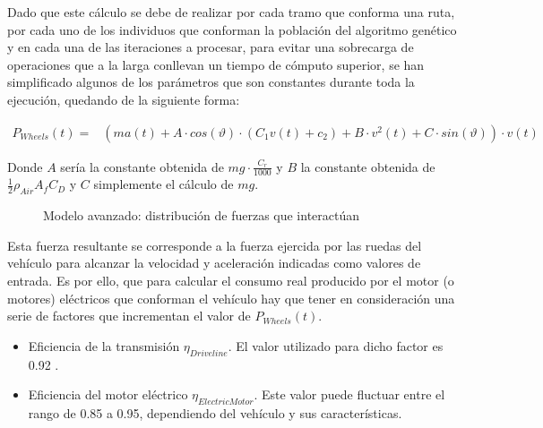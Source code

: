 \documentclass[11pt,spanish,listoffigures,listoftables]{tfgetsinf}
\begin{document}
\begin{itemize}
    Dado que este cálculo se debe de realizar por cada tramo que conforma una ruta, por cada uno de los individuos que conforman la población del algoritmo genético y en cada una de las iteraciones a procesar, para evitar una sobrecarga de operaciones que a la larga conllevan un tiempo de cómputo superior, se han simplificado algunos de los parámetros que son constantes durante toda la ejecución, quedando de la siguiente forma:
    
    \begin{align*}
        P_{Wheels}(t) = & \left(ma(t) + A \cdot cos(\vartheta) \cdot (C_{1}v(t) + c_{2}) + B \cdot v^{2}(t) + C \cdot sin(\vartheta) \right) \cdot v(t)
    \end{align*}
    
    Donde $A$ sería la constante obtenida de $mg \cdot \frac{C_{r}}{1000}$ y $B$ la constante obtenida de $\frac{1}{2}\rho_{Air}A_{f}C_{D}$ y $C$ simplemente el cálculo de $mg$.
    
    \begin{figure}[ht]
    \centering
    \caption{Modelo avanzado: distribución de fuerzas que interactúan}
    \end{figure}
    
    Esta fuerza resultante se corresponde a la fuerza ejercida por las ruedas del vehículo para alcanzar la velocidad y aceleración indicadas como valores de entrada. Es por ello, que para calcular el consumo real producido por el motor (o motores) eléctricos que conforman el vehículo hay que tener en consideración una serie de factores que incrementan el valor de $P_{Wheels}(t)$.
    \begin{itemize}
        \item Eficiencia de la transmisión $\eta_{Driveline}$. El valor utilizado para dicho factor es 0.92 \cite{RAKHA2011492}.
        \item Eficiencia del motor eléctrico $\eta_{Electric Motor}$. Este valor puede fluctuar entre el rango de 0.85 a 0.95, dependiendo del vehículo y sus características.
    \end{itemize}
    

\end{itemize}
\end{document}
